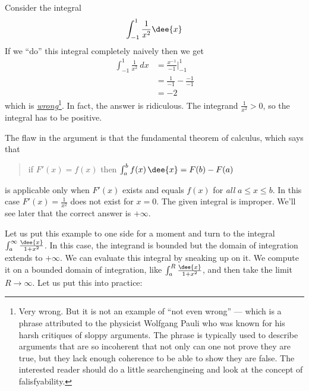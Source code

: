 \begin{eg}\label{eg:IMPtrap}
Consider the integral
\begin{align*}
  \int_{-1}^1 \frac{1}{x^2}\dee{x}
\end{align*}
If we ``do'' this integral completely naively then we get
\begin{align*}
  \int_{-1}^1\frac{1}{x^2}\ dx
  &= \frac{x^{-1}}{-1}\bigg|_{-1}^1\\
  &= \frac{1}{-1}-\frac{-1}{-1}\\
  &=-2
\end{align*}
which is \underline{\emph{wrong}}\footnote{Very wrong. But it is not an example of
``not even wrong'' --- which is a phrase attributed to the physicist Wolfgang Pauli who
was known for his harsh critiques of sloppy arguments. The phrase is typically
used to describe arguments that are so incoherent that not only can one
not prove they are true, but they lack enough coherence to be able to
show they are false. The interested reader should do a little searchengineing
and look at the concept of falisfyability.}. In fact, the answer is ridiculous.
The integrand $\frac{1}{x^2}>0$, so
the integral has to be positive.

The flaw in the argument is that the fundamental theorem of calculus, which says that
\begin{quote}
 if $F'(x)=f(x)$ then $\int_a^b f(x)\,\dee{x}=F(b)-F(a)$
\end{quote}
is applicable only when $F'(x)$ exists and equals $f(x)$ for \emph{all} $a\le x\le b$.
In this case $F'(x)=\frac{1}{x^2}$ does not exist for $x=0$. The given integral is
improper. We'll see later that the correct answer is $+\infty$.
\end{eg}
Let us put this example to one side for a moment and turn to the integral
$\int_a^\infty\frac{\dee{x}}{1+x^2}$. In this case, the integrand is bounded but the
domain of integration extends to $+\infty$. We can evaluate this integral by sneaking up
on it. We compute it on a  bounded domain of integration, like
$\int_a^R\frac{\dee{x}}{1+x^2}$, and then take the limit $R\rightarrow\infty$.
%
Let us put this into practice:
